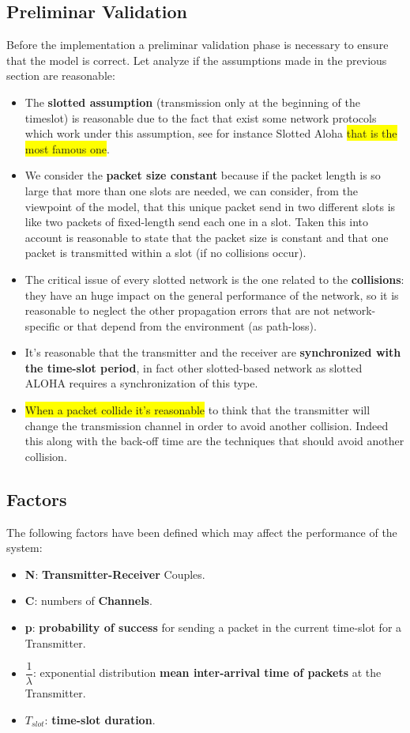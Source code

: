 \subsection{Preliminar Validation}
Before the implementation a preliminar validation phase is necessary to ensure that the model is correct. Let analyze if the assumptions made in the previous section are reasonable:
\begin{itemize}
	\item The \textbf{slotted assumption} (transmission only at the beginning of the timeslot) is reasonable due to the fact that exist some network protocols which work under this assumption, see for instance Slotted Aloha \colorbox{yellow}{that is the most famous one}.
	\item We consider the \textbf{packet size constant} because if the packet length is so large that more than one slots are needed, we can consider, from the viewpoint of the model, that this unique packet send in two different slots is like two packets of fixed-length send each one in a slot. Taken this into account is reasonable to state that the packet size is constant and that one packet is transmitted within a slot (if no collisions occur).
	\item The critical issue of every slotted network is the one related to the \textbf{collisions}: they have an huge impact on the general performance of the network, so it is reasonable to neglect the other propagation errors that are not network-specific or that depend from the environment (as path-loss).
	\item It's reasonable that the transmitter and the receiver are \textbf{synchronized with the time-slot period}, in fact other slotted-based network as slotted ALOHA requires a synchronization of this type.
	\item \colorbox{yellow}{When a packet collide it's reasonable} to think that the transmitter will change the transmission channel in order to avoid another collision. Indeed this along with the back-off time are the techniques that should avoid another collision. 
\end{itemize}
\subsection{Factors}
The following factors have been defined which may affect the performance of the system:
\begin{itemize}
	\item \textbf{N}: \textbf{Transmitter-Receiver} Couples.
	\item \textbf{C}: numbers of \textbf{Channels}.
	\item \textbf{p}: \textbf{probability of success} for sending a packet in the current time-slot for a Transmitter.
	\item \textbf{$\dfrac{1}{\lambda}$}: exponential distribution \textbf{mean inter-arrival time of packets} at the Transmitter.
	\item $T_{slot}$: \textbf{time-slot duration}.
	
\end{itemize}